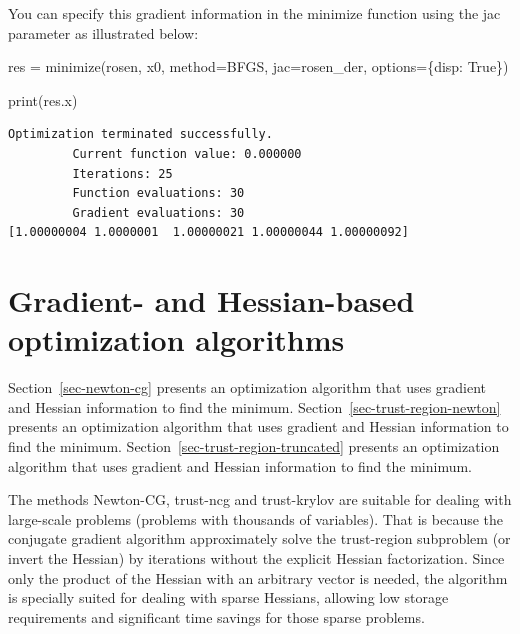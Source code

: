 \documentclass[
  letterpaper,
  DIV=11,
  numbers=noendperiod]{scrreprt}
\newenvironment{Shaded}{\begin{snugshade}}{\end{snugshade}}
\newcommand{\BuiltInTok}[1]{\textcolor[rgb]{0.00,0.23,0.31}{#1}}
\newcommand{\NormalTok}[1]{\textcolor[rgb]{0.00,0.23,0.31}{#1}}
\newcommand{\OperatorTok}[1]{\textcolor[rgb]{0.37,0.37,0.37}{#1}}
\newcommand{\StringTok}[1]{\textcolor[rgb]{0.13,0.47,0.30}{#1}}
\newcommand{\VariableTok}[1]{\textcolor[rgb]{0.07,0.07,0.07}{#1}}
\begin{document}
You can specify this gradient information in the minimize function using
the jac parameter as illustrated below:

\begin{Shaded}
\begin{Highlighting}[]
\NormalTok{res }\OperatorTok{=}\NormalTok{ minimize(rosen, x0, method}\OperatorTok{=}\StringTok{\textquotesingle{}BFGS\textquotesingle{}}\NormalTok{, jac}\OperatorTok{=}\NormalTok{rosen\_der,}
\NormalTok{               options}\OperatorTok{=}\NormalTok{\{}\StringTok{\textquotesingle{}disp\textquotesingle{}}\NormalTok{: }\VariableTok{True}\NormalTok{\})}

\BuiltInTok{print}\NormalTok{(res.x)}
\end{Highlighting}
\end{Shaded}

\begin{verbatim}
Optimization terminated successfully.
         Current function value: 0.000000
         Iterations: 25
         Function evaluations: 30
         Gradient evaluations: 30
[1.00000004 1.0000001  1.00000021 1.00000044 1.00000092]
\end{verbatim}

\hypertarget{gradient--and-hessian-based-optimization-algorithms}{%
\section{Gradient- and Hessian-based optimization
algorithms}\label{gradient--and-hessian-based-optimization-algorithms}}

Section~\ref{sec-newton-cg} presents an optimization algorithm that uses
gradient and Hessian information to find the minimum.
Section~\ref{sec-trust-region-newton} presents an optimization algorithm
that uses gradient and Hessian information to find the minimum.
Section~\ref{sec-trust-region-truncated} presents an optimization
algorithm that uses gradient and Hessian information to find the
minimum.

The methods Newton-CG, trust-ncg and trust-krylov are suitable for
dealing with large-scale problems (problems with thousands of
variables). That is because the conjugate gradient algorithm
approximately solve the trust-region subproblem (or invert the Hessian)
by iterations without the explicit Hessian factorization. Since only the
product of the Hessian with an arbitrary vector is needed, the algorithm
is specially suited for dealing with sparse Hessians, allowing low
storage requirements and significant time savings for those sparse
problems.
\end{document}
